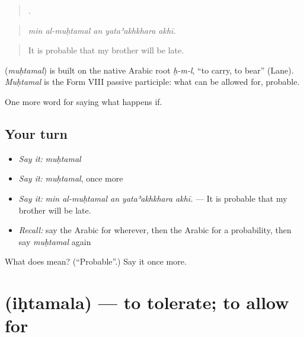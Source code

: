 \begin{quote}
    .
\end{quote}

\begin{quote}
\emph{min al-muḥtamal an yataʾakhkhara akhī.}
\end{quote}

\begin{quote}
It is probable that my brother will be late.
\end{quote}

\begin{cousinweb}
\textbf{} (\emph{muḥtamal}) is built on the native Arabic root \emph{ḥ-m-l}, \textquotedblleft{}to carry, to bear\textquotedblright{} (Lane). \emph{Muḥtamal} is the Form VIII passive participle: what can be allowed for, probable.
\end{cousinweb}

\begin{grammarlens}[title={What you've built}]
One more word for saying what happens if.
\end{grammarlens}

\subsection*{Your turn}
\begin{itemize}
\raggedright
  \item \emph{Say it:} \emph{muḥtamal}
  \item \emph{Say it:} \emph{muḥtamal}, once more
  \item \emph{Say it:} \emph{min al-muḥtamal an yataʾakhkhara akhī.} — It is probable that my brother will be late.
  \item \emph{Recall:} say the Arabic for wherever, then the Arabic for a probability, then say \emph{muḥtamal} again
\end{itemize}

\begin{tcolorbox}[breakable,colback=teal!4,colframe=teal!35!black,title={Before you move on}]
What does  mean? (\textquotedblleft{}Probable\textquotedblright{}.) Say it once more.
\end{tcolorbox}
\section[\texorpdfstring{\ar{احتمل} (iḥtamala)}{احتمل (iḥtamala)}]{ (iḥtamala) — to tolerate; to allow for}

